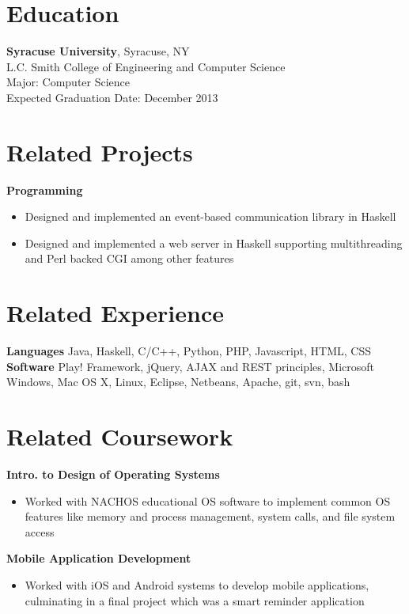 \documentclass[margin]{res}
\begin{document}
 
 
 
\address{{\bf Address} \\ 28 Sand Pond Road \\ Warwick, RI 02888 \\ danielwilsonthomas@gmail.com}
 
\begin{resume} 
 
\section{Education} 
{\bf Syracuse University}, Syracuse, NY \\
L.C. Smith College of Engineering and Computer Science \\
Major: Computer Science \\
Expected Graduation Date: December 2013

\section{Related Projects}
{\bf Programming} 
\begin{itemize} %
\item Designed and implemented an event-based communication library in Haskell
\item Designed and implemented a web server in Haskell supporting multithreading and Perl backed CGI among other features
\end{itemize}

\section{Related Experience}
 {\bf Languages} Java, Haskell, C/C++, Python, PHP, Javascript, HTML, CSS \\
 {\bf Software} Play! Framework, jQuery, AJAX and REST principles, Microsoft Windows, Mac OS X, Linux, Eclipse, Netbeans, Apache, git, svn, bash

\section{Related Coursework}
{\bf Intro. to Design of Operating Systems}
\begin{itemize}
\item Worked with NACHOS educational OS software to implement common OS features like memory and process management, system calls, and file system access
\end{itemize}
{\bf Mobile Application Development}
\begin{itemize}
\item Worked with iOS and Android systems to develop mobile applications, culminating in a final project which was a smart reminder application
\end{itemize}


\end{resume}
\end{document}
